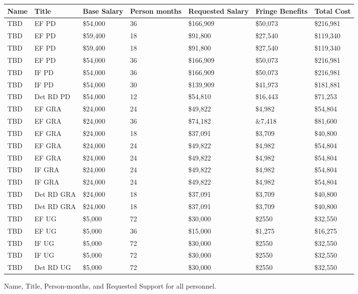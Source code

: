 \begin{table}[htb]
\centering
\begin{tabular}{ || l || l |  p{1.7cm} | p{1.7cm} | p{1.7cm} || p{1.7cm} | p{1.8cm} || }
\hline\hline\hline
\textbf{Name} & \textbf{Title} & \textbf{Base Salary} & \textbf{Person months} & \textbf{Requested Salary} & \textbf{Fringe Benefits} & \textbf{Total Cost} \\ \hline\hline
TBD & EF PD & \$54,000 & 36 & \$166,909 & \$50,073 & \$216,981 \\ \hline
TBD & EF PD & \$59,400 & 18 & \$91,800 & \$27,540 & \$119,340 \\ \hline
TBD & EF PD & \$59,400 & 18 & \$91,800 & \$27,540 & \$119,340 \\ \hline
TBD & EF PD & \$54,000 & 36 & \$166,909 & \$50,073 & \$216,981 \\ \hline
TBD & IF PD & \$54,000 & 36 & \$166,909 & \$50,073 & \$216,981 \\ \hline
TBD & IF PD & \$54,000 & 30 & \$139,909 & \$41,973 & \$181,881 \\ \hline
TBD & Det RD PD & \$54,000 & 12 & \$54,810 & \$16,443 & \$71,253  \\ \hline
TBD & EF GRA & \$24,000 & 24 & \$49,822 & \$4,982 & \$54,804 \\ \hline
TBD & EF GRA & \$24,000 & 36 & \$74,182 & \&7,418 & \$81,600 \\ \hline
TBD & EF GRA & \$24,000 & 18 & \$37,091 & \$3,709 & \$40,800 \\ \hline
TBD & EF GRA & \$24,000 & 24 & \$49,822 & \$4,982 & \$54,804 \\ \hline
TBD & EF GRA & \$24,000 & 24 & \$49,822 & \$4,982 & \$54,804 \\ \hline
TBD & IF GRA & \$24,000 & 24 & \$49,822 & \$4,982 & \$54,804 \\ \hline
TBD & IF GRA & \$24,000 & 24 & \$49,822 & \$4,982 & \$54,804 \\ \hline
TBD & Det RD GRA & \$24,000 & 18 & \$37,091 & \$3,709 & \$40,800 \\ \hline
TBD & Det RD GRA & \$24,000 & 18 & \$37,091 & \$3,709 & \$40,800 \\ \hline
TBD & EF UG & \$5,000 & 72 & \$30,000 & \$2550 & \$32,550 \\ \hline
TBD & EF UG & \$5,000 & 36 & \$15,000 & \$1,275 & \$16,275 \\ \hline
TBD & IF UG & \$5,000 & 72 & \$30,000 & \$2550 & \$32,550 \\ \hline
TBD & IF UG & \$5,000 & 72 & \$30,000 & \$2550 & \$32,550 \\ \hline
TBD & Det RD UG & \$5,000 & 72 & \$30,000 & \$2550 & \$32,550 \\ \hline
\hline\hline\hline
\end{tabular}
\end{table}
\caption{Name, Title, Person-months, and Requested Support for all personnel.}